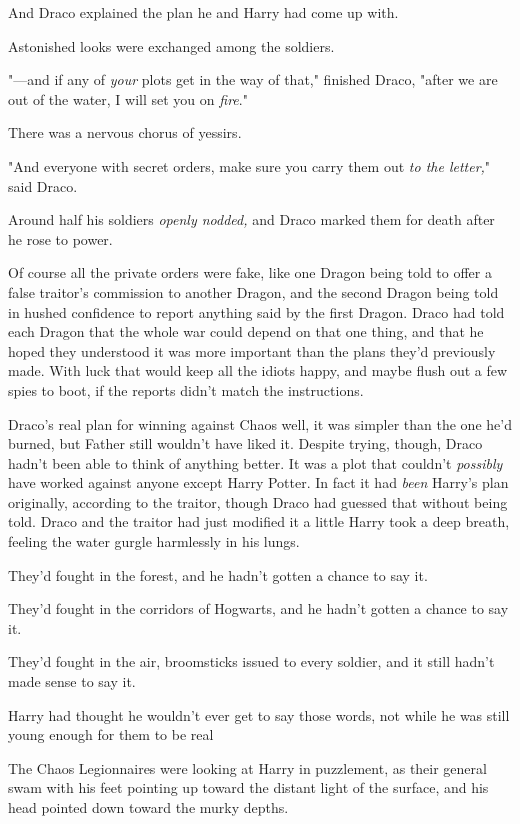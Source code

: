 And Draco explained the plan he and Harry had come up with.

Astonished looks were exchanged among the soldiers.

"---and if any of \emph{your} plots get in the way of that," finished Draco,
"after we are out of the water, I will set you on \emph{fire}."

There was a nervous chorus of yessirs.

"And everyone with secret orders, make sure you carry them out \emph{to the
letter,}" said Draco.

Around half his soldiers \emph{openly nodded,} and Draco marked them for death
after he rose to power.

Of course all the private orders were fake, like one Dragon being told to offer
a false traitor's commission to another Dragon, and the second Dragon being
told in hushed confidence to report anything said by the first Dragon. Draco
had told each Dragon that the whole war could depend on that one thing, and
that he hoped they understood it was more important than the plans they'd
previously made. With luck that would keep all the idiots happy, and maybe
flush out a few spies to boot, if the reports didn't match the instructions.

Draco's real plan for winning against Chaos{\el} well, it was simpler than
the one he'd burned, but Father still wouldn't have liked it. Despite trying,
though, Draco hadn't been able to think of anything better. It was a plot that
couldn't \emph{possibly} have worked against anyone except Harry Potter. In
fact it had \emph{been} Harry's plan originally, according to the traitor,
though Draco had guessed that without being told. Draco and the traitor had
just modified it a little{\el}
\sbreak
Harry took a deep breath, feeling the water gurgle harmlessly in his lungs.

They'd fought in the forest, and he hadn't gotten a chance to say it.

They'd fought in the corridors of Hogwarts, and he hadn't gotten a chance to
say it.

They'd fought in the air, broomsticks issued to every soldier, and it still
hadn't made sense to say it.

Harry had thought he wouldn't ever get to say those words, not while he was
still young enough for them to be real{\el}

The Chaos Legionnaires were looking at Harry in puzzlement, as their general
swam with his feet pointing up toward the distant light of the surface, and his
head pointed down toward the murky depths.

